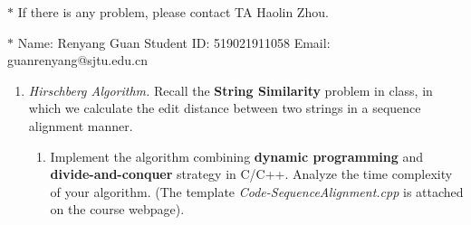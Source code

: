 \documentclass[12pt,a4paper]{article}
\theoremstyle{definition}
\begin{document}
\noindent

\noindent{}
\begin{center}
\footnotesize{\color{red}$*$ If there is any problem, please contact TA Haolin Zhou.}

\footnotesize{\color{blue}$*$ Name: Renyang Guan  \quad Student ID: 519021911058 \quad Email: guanrenyang@sjtu.edu.cn}
\end{center}

\begin{enumerate}
    \item
    \textit{Hirschberg Algorithm.} Recall the \textbf{String Similarity} problem in class, in which we calculate the edit distance between two strings in a sequence alignment manner.
    \begin{enumerate}
    	\item
    	Implement the algorithm combining \textbf{dynamic programming} and \textbf{divide-and-conquer} strategy in C/C++. Analyze the time complexity of your algorithm. {\color{blue}(The template \emph{Code-SequenceAlignment.cpp} is attached on the course webpage)}.
    	

\end{enumerate}
\end{enumerate}
\end{document}
